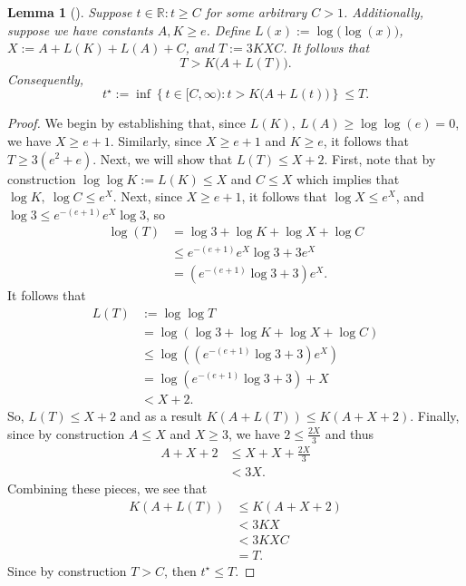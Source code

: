 \documentclass[11pt]{article}
\newtheorem{lemma}{Lemma}
\begin{document}
\begin{lemma}[]
Suppose $t \in \mathbb{R}: t \ge C$ for some arbitrary $C > 1$. Additionally, suppose we have constants $A, K \ge e$. Define $L(x):=\log\!\bigl(\log(x)\bigr)$, $X := A + L(K) + L(A) + C$, and $T := 3KXC$. 
It follows that
\[
T > K\bigl(A+L(T)\bigr).
\]
Consequently,
\[
t^\star := \inf\left\{ t \in [C, \infty): t > K\bigl(A+L(t)\bigr) \right\} \le T.
\]
\label{lemma:critical_lemma}
\end{lemma}

\begin{proof}
We begin by establishing that, since $L(K), \ L(A)\ge \log\log(e)=0$, we have $X \ge e + 1$. Similarly, since $X \ge e + 1$ and $K \ge e$, it follows that $T \ge 3(e^2 + e)$. Next, we will show that $L(T)\le X+2$. First, note that by construction $\log \log K := L(K) \le X$ and $C \le X$ which implies that $\log K, \ \log C \le e^X$. Next, since $X \ge e+1$, it follows that $\log X \le e^X$, and $\log 3 \le e^{-(e + 1)}e^X\log 3$, so
\begin{align*}
    \log(T) &=\log3 + \log K + \log X + \log C \\
    &\le e^{-(e + 1)}e^X\log 3 +3e^X \\
    &= (e^{-(e + 1)}\log 3 + 3)e^X.
\end{align*}
It follows that
\begin{align*}
    L(T) &:= \log\log T \\
    &= \log(\log 3 + \log K + \log X + \log C) \\
    &\le \log((e^{-(e + 1)}\log 3 + 3)e^X) \\
    &= \log(e^{-(e + 1)}\log 3 + 3) + X \\
    &< X + 2.
\end{align*}
So, $L(T) \le X + 2$ and as a result $K(A + L(T)) \le K(A + X + 2)$. Finally, since by construction $A \le X$ and $X \ge 3$, we have $2 \le \frac{2X}{3}$ and thus 
\begin{align*}
    A + X + 2 &\le X + X + \frac{2X}{3} \\
    &<3X.
\end{align*}
Combining these pieces, we see that
\begin{align*}
    K(A + L(T)) &\le K(A + X + 2) \\
    &<3KX \\
    &< 3KXC \\
    &= T.
\end{align*}
Since by construction $T > C$, then $t^\star \le T$.
\end{proof}
\end{document}
